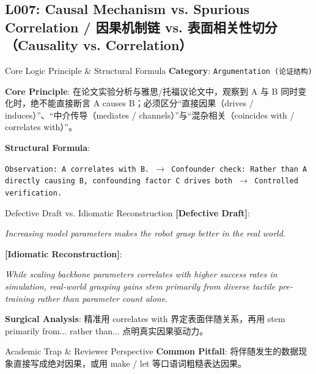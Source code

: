 \subsection{L007: Causal Mechanism vs. Spurious Correlation / 因果机制链 vs. 表面相关性切分（Causality vs. Correlation）}\label{sec:logic:L007}
\begin{ConceptBox}{Core Logic Principle \& Structural Formula}
\textbf{Category}: \texttt{Argumentation (论证结构)}\par\vspace{3pt}
\textbf{Core Principle}: 在论文实验分析与雅思/托福议论文中，观察到 A 与 B 同时变化时，绝不能直接断言 A causes B；必须区分“直接因果（drives / induces）”、“中介传导（mediates / channels）”与“混杂相关（coincides with / correlates with）”。\par\vspace{4pt}
\textbf{Structural Formula}:\par\noindent\texttt{Observation: A correlates with B. $\to$ Confounder check: Rather than A directly causing B, confounding factor C drives both $\to$ Controlled verification.}
\end{ConceptBox}
\begin{ExampleBox}{Defective Draft vs. Idiomatic Reconstruction}
\textbf{\color{TargetHighlight}[Defective Draft]}:\par\textit{Increasing model parameters makes the robot grasp better in the real world.}\par\vspace{4pt}
\textbf{\color{AcadNavy}[Idiomatic Reconstruction]}:\par\textit{While scaling backbone parameters correlates with higher success rates in simulation, real-world grasping gains stem primarily from diverse tactile pre-training rather than parameter count alone.}\par\vspace{4pt}
\textbf{Surgical Analysis}: 精准用 correlates with 界定表面伴随关系，再用 stem primarily from... rather than... 点明真实因果驱动力。
\end{ExampleBox}
\begin{TipBox}{Academic Trap \& Reviewer Perspective}
\textbf{Common Pitfall}: 将伴随发生的数据现象直接写成绝对因果，或用 make / let 等口语词粗糙表达因果。
\end{TipBox}
\vspace{6pt}
